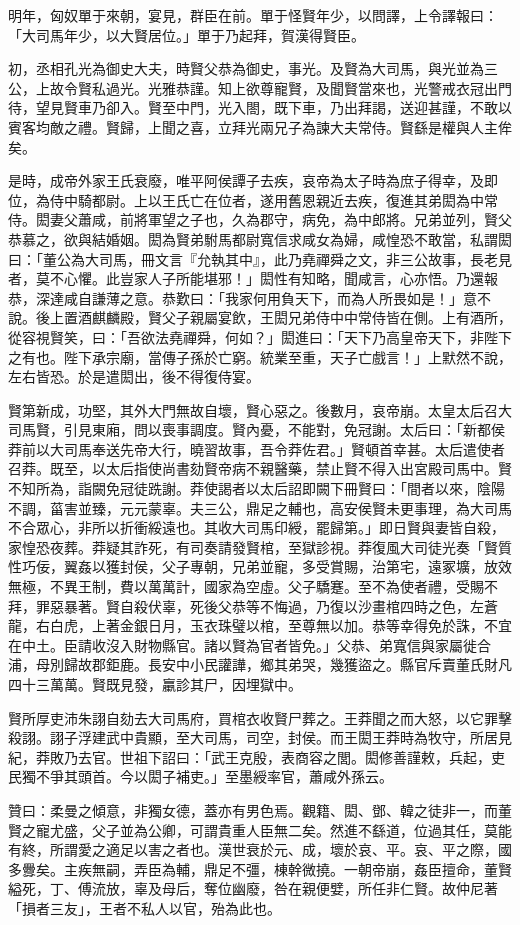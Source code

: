 \begin{pinyinscope}
明年，匈奴單于來朝，宴見，群臣在前。單于怪賢年少，以問譯，上令譯報曰：「大司馬年少，以大賢居位。」單于乃起拜，賀漢得賢臣。

初，丞相孔光為御史大夫，時賢父恭為御史，事光。及賢為大司馬，與光並為三公，上故令賢私過光。光雅恭謹。知上欲尊寵賢，及聞賢當來也，光警戒衣冠出門待，望見賢車乃卻入。賢至中門，光入閤，既下車，乃出拜謁，送迎甚謹，不敢以賓客均敵之禮。賢歸，上聞之喜，立拜光兩兄子為諫大夫常侍。賢繇是權與人主侔矣。

是時，成帝外家王氏衰廢，唯平阿侯譚子去疾，哀帝為太子時為庶子得幸，及即位，為侍中騎都尉。上以王氏亡在位者，遂用舊恩親近去疾，復進其弟閎為中常侍。閎妻父蕭咸，前將軍望之子也，久為郡守，病免，為中郎將。兄弟並列，賢父恭慕之，欲與結婚姻。閎為賢弟駙馬都尉寬信求咸女為婦，咸惶恐不敢當，私謂閎曰：「董公為大司馬，冊文言『允執其中』，此乃堯禪舜之文，非三公故事，長老見者，莫不心懼。此豈家人子所能堪邪！」閎性有知略，聞咸言，心亦悟。乃還報恭，深達咸自謙薄之意。恭歎曰：「我家何用負天下，而為人所畏如是！」意不說。後上置酒麒麟殿，賢父子親屬宴飲，王閎兄弟侍中中常侍皆在側。上有酒所，從容視賢笑，曰：「吾欲法堯禪舜，何如？」閎進曰：「天下乃高皇帝天下，非陛下之有也。陛下承宗廟，當傳子孫於亡窮。統業至重，天子亡戲言！」上默然不說，左右皆恐。於是遣閎出，後不得復侍宴。

賢第新成，功堅，其外大門無故自壞，賢心惡之。後數月，哀帝崩。太皇太后召大司馬賢，引見東廂，問以喪事調度。賢內憂，不能對，免冠謝。太后曰：「新都侯莽前以大司馬奉送先帝大行，曉習故事，吾令莽佐君。」賢頓首幸甚。太后遣使者召莽。既至，以太后指使尚書劾賢帝病不親醫藥，禁止賢不得入出宮殿司馬中。賢不知所為，詣闕免冠徒跣謝。莽使謁者以太后詔即闕下冊賢曰：「間者以來，陰陽不調，菑害並臻，元元蒙辜。夫三公，鼎足之輔也，高安侯賢未更事理，為大司馬不合眾心，非所以折衝綏遠也。其收大司馬印綬，罷歸第。」即日賢與妻皆自殺，家惶恐夜葬。莽疑其詐死，有司奏請發賢棺，至獄診視。莽復風大司徒光奏「賢質性巧佞，翼姦以獲封侯，父子專朝，兄弟並寵，多受賞賜，治第宅，遠冢壙，放效無極，不異王制，費以萬萬計，國家為空虛。父子驕蹇。至不為使者禮，受賜不拜，罪惡暴著。賢自殺伏辜，死後父恭等不悔過，乃復以沙畫棺四時之色，左蒼龍，右白虎，上著金銀日月，玉衣珠璧以棺，至尊無以加。恭等幸得免於誅，不宜在中土。臣請收沒入財物縣官。諸以賢為官者皆免。」父恭、弟寬信與家屬徙合浦，母別歸故郡鉅鹿。長安中小民讙譁，鄉其弟哭，幾獲盜之。縣官斥賣董氏財凡四十三萬萬。賢既見發，臝診其尸，因埋獄中。

賢所厚吏沛朱詡自劾去大司馬府，買棺衣收賢尸葬之。王莽聞之而大怒，以它罪擊殺詡。詡子浮建武中貴顯，至大司馬，司空，封侯。而王閎王莽時為牧守，所居見紀，莽敗乃去官。世祖下詔曰：「武王克殷，表商容之閭。閎修善謹敕，兵起，吏民獨不爭其頭首。今以閎子補吏。」至墨綬率官，蕭咸外孫云。

贊曰：柔曼之傾意，非獨女德，蓋亦有男色焉。觀籍、閎、鄧、韓之徒非一，而董賢之寵尤盛，父子並為公卿，可謂貴重人臣無二矣。然進不繇道，位過其任，莫能有終，所謂愛之適足以害之者也。漢世衰於元、成，壞於哀、平。哀、平之際，國多釁矣。主疾無嗣，弄臣為輔，鼎足不彊，棟幹微撓。一朝帝崩，姦臣擅命，董賢縊死，丁、傅流放，辜及母后，奪位幽廢，咎在親便嬖，所任非仁賢。故仲尼著「損者三友」，王者不私人以官，殆為此也。


\end{pinyinscope}